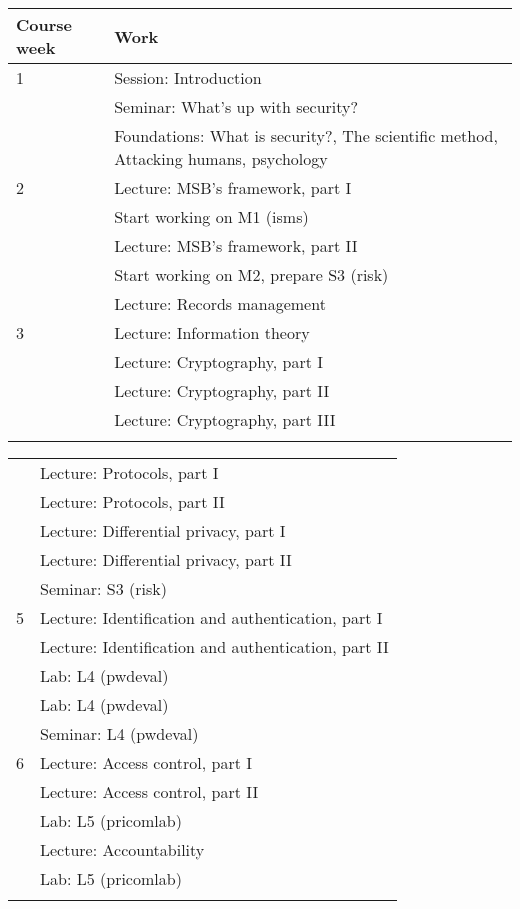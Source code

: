 	\centering
  \begin{tabular}{lp{9cm}}
    \toprule
    \textbf{Course week}	& \textbf{Work} \\
    \midrule
    1
      & Session: Introduction\\
      & Seminar: What's up with security?\\
      & Foundations: What is security?, The scientific method, Attacking 
      humans, psychology\\
    \midrule
    2
      & Lecture: MSB's framework, part I\\
      & Start working on M1 (isms)\\
      & Lecture: MSB's framework, part II\\
      & Start working on M2, prepare S3 (risk)\\
      & Lecture: Records management\\
    \midrule
    3
      & Lecture: Information theory\\
      & Lecture: Cryptography, part I\\
      & Lecture: Cryptography, part II\\
      & Lecture: Cryptography, part III\\
    \midrule
\mode<presentation>{%
  \end{tabular}
  \begin{tabular}{lp{9cm}}
}%
    4
      & Lecture: Protocols, part I\\
      & Lecture: Protocols, part II\\
      & Lecture: Differential privacy, part I\\
      & Lecture: Differential privacy, part II\\
      & Seminar: S3 (risk)\\
    \midrule
    5
      & Lecture: Identification and authentication, part I\\
      & Lecture: Identification and authentication, part II\\
      & Lab: L4 (pwdeval)\\
      & Lab: L4 (pwdeval)\\
      & Seminar: L4 (pwdeval)\\
    \midrule
    6
      & Lecture: Access control, part I\\
      & Lecture: Access control, part II\\
      & Lab: L5 (pricomlab)\\
      & Lecture: Accountability\\
      & Lab: L5 (pricomlab)\\
    \midrule
\mode<presentation>{%
  \end{tabular}
